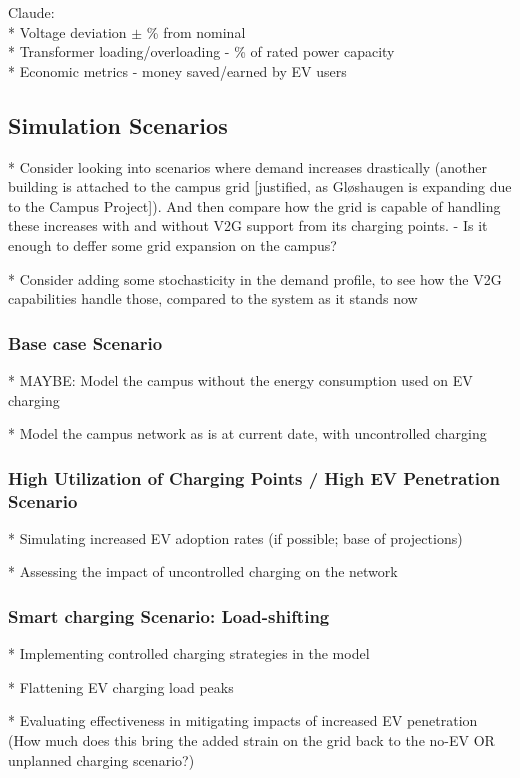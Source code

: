 Claude: \\
* Voltage deviation $\pm$ \% from nominal \\
* Transformer loading/overloading - \% of rated power capacity \\
* Economic metrics - money saved/earned by EV users


\subsection{Simulation Scenarios}

* Consider looking into scenarios where demand increases drastically (another building is attached to the campus grid [justified, as Gløshaugen is expanding due to the Campus Project]). And then compare how the grid is capable of handling these increases with and without V2G support from its charging points. - Is it enough to deffer some grid expansion on the campus? 

* Consider adding some stochasticity in the demand profile, to see how the V2G capabilities handle those, compared to the system as it stands now

\subsubsection{Base case Scenario}

* MAYBE: Model the campus without the energy consumption used on EV charging

* Model the campus network as is at current date, with uncontrolled charging


\subsubsection{High Utilization of Charging Points / High EV Penetration Scenario}

* Simulating increased EV adoption rates (if possible; base of projections)

* Assessing the impact of uncontrolled charging on the network


\subsubsection{Smart charging Scenario: Load-shifting}

* Implementing controlled charging strategies in the model

* Flattening EV charging load peaks

* Evaluating effectiveness in mitigating impacts of increased EV penetration (How much does this bring the added strain on the grid back to the no-EV OR unplanned charging scenario?)


